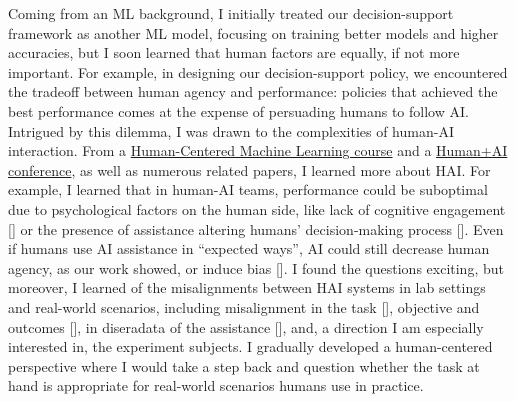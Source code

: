 






Coming from an ML background, I initially treated our decision-support framework as another ML model, focusing on training better models and higher accuracies, but I soon learned that human factors are equally, if not more important. For example, in designing our decision-support policy, we encountered the tradeoff between human agency and performance: policies that achieved the best performance comes at the expense of persuading humans to follow AI. Intrigued by this dilemma, I was drawn to the complexities of human-AI interaction.
From a \href{https://github.com/ChicagoHAI/human-centered-machine-learning}{Human-Centered Machine Learning course} and a \href{https://datascience.uchicago.edu/events/human-ai-conference/}{Human+AI conference}, as well as numerous related papers, I learned more about HAI.
For example, I learned that in human-AI teams, performance could be suboptimal due to psychological factors on the human side, like lack of cognitive engagement [] or the presence of assistance altering humans' decision-making process []. 
Even if humans use AI assistance in “expected ways”, AI could still decrease human agency, as our work showed, or induce bias []. 
I found the questions exciting, but moreover, I learned of the misalignments between HAI systems in lab settings and real-world scenarios, including misalignment in the task [], objective and outcomes [], in diseradata of the assistance [], and, a direction I am especially interested in, the experiment subjects. 
I gradually developed a human-centered perspective where I would take a step back and question whether the task at hand is appropriate for real-world scenarios humans use in practice.





